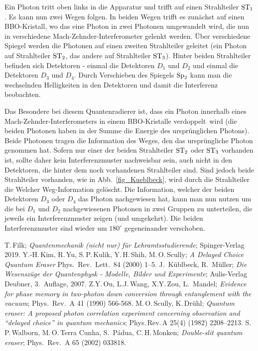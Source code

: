 Ein Photon tritt oben links in die Apparatur und trifft auf einen Strahlteiler ${\rm ST}_1$. Es kann nun
zwei Wegen folgen. In beiden Wegen trifft es zun\"achst auf einen BBO-Kristall, wo das eine Photon
in zwei Photonen umgewandelt wird, die nun in verschiedene Mach-Zehnder-Interferometer gelenkt
werden. \"Uber verschiedene Spiegel werden die Photonen auf einen zweiten Strahlteiler geleitet
(ein Photon auf Strahlteiler ${\rm ST}_2$, das andere auf Strahlteiler ${\rm ST}_3$). 
Hinter beiden Strahlteiler befinden sich Detektoren - einmal die Detektoren 
$D_1$ und $D_2$ und einmal die Detektoren $D_3$ und $D_4$. 
Durch Verschieben des Spiegels ${\rm Sp}_2$ kann man die wechselnden Helligkeiten
in den Detektoren und damit die Interferenz beobachten.

Das Besondere bei diesem Quantenradierer ist, dass ein Photon innerhalb eines Mach-Zehnder-Interferometers
in einem BBO-Kristalle \glqq verdoppelt\grqq\ wird (die beiden Photonen haben 
in der Summe die Energie des urspr\"unglichen Photons).
Beide Photonen tragen die Information des Weges, den das urspr\"ungliche Photon genommen
hat. Sofern nur einer der beiden Strahlteiler ${\rm ST}_2$ oder ${\rm ST}_3$ vorhanden ist, sollte
daher kein Interferenzmuster nachweisbar sein, auch nicht in den Detektoren, die hinter dem
noch vorhandenen Strahlteiler sind. Sind jedoch beide Strahlteiler vorhanden, wie in Abb.\ \ref{fig_Kueblbeck},
wird durch die Strahlteiler die \glqq Welcher Weg\grqq-Information gel\"oscht.
Die Information, welcher der beiden Detektoren $D_3$ oder $D_4$ das Photon nachgewiesen
hat, kann man nun nutzen um die bei $D_1$ und $D_2$ nachgewiesenen Photonen in zwei Gruppen
zu unterteilen, die jeweils ein Interferenzmuster zeigen (und umgekehrt). 
Die beiden Interferenzmuster sind wieder um $180^\circ$ gegeneinander verschoben.   

\begin{thebibliography}{99}
 T.\,Filk; \textit{Quantenmechanik (nicht nur) f\"ur Lehramtsstudierende};
          Spinger-Verlag 2019. 
 Y.-H.\,Kim, R.\,Yu, S.\,P.\,Kulik, Y.\,H.\,Shih, M.\,O.\,Scully; \textit{A Delayed Choice Quantum Eraser}
            Phys.\ Rev.\ Lett.\ 84 (2000) 1--5.          
 J.\ K\"ublbeck, R.\ M\"uller; \textit{Die Wesensz\"uge der Quantenphysk - Modelle,
           Bilder und Experimente}; Aulis-Verlag Deubner, 3.\ Auflage, 2007.   
 Z.Y.\,Ou, L.J.\,Wang, X.Y.\,Zou, L.\ Mandel; \textit{Evidence for phase memory in two-photon
           down conversion through entanglement with the vacuum}; Phys.\ Rev.\ A 41 (1990) 566-568.                     
 M.\,O.\,Scully, K.\,Dr\"uhl; \textit{Quantum eraser: A proposed photon correlation
         experiment concerning observation and ``delayed choice'' in quantum mechanics}; 
         Phys.\,Rev.\,A 25(4) (1982) 2208--2213.          
 S.\,P.\,Walborn, M.\,O.\,Terra Cunha, S.\ P\'{a}dua, C.\,H.\,Monken;
         \textit{Double-slit quantum eraser}; Phys.\ Rev.\ A 65 (2002) 033818.
\end{thebibliography}
%

